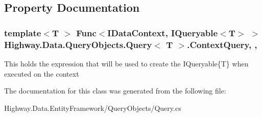 \subsection{Property Documentation}
\hypertarget{class_highway_1_1_data_1_1_query_objects_1_1_query-g_a68ecc8e5735dee1db60782614427cbbf}{
\subsubsection[{Context\-Query}]{\setlength{\rightskip}{0pt plus 5cm}template$<$T $>$ Func$<${\bf I\-Data\-Context}, I\-Queryable$<$T$>$ $>$ {\bf Highway.\-Data.\-Query\-Objects.\-Query}$<$ T $>$.Context\-Query\hspace{0.3cm}{\ttfamily [get]}, {\ttfamily [set]}, {\ttfamily [protected]}}}\label{class_highway_1_1_data_1_1_query_objects_1_1_query-g_a68ecc8e5735dee1db60782614427cbbf}


This holds the expression that will be used to create the I\-Queryable\{\-T\} when executed on the context 



The documentation for this class was generated from the following file\-:\begin{DoxyCompactItemize}
\item 
Highway.\-Data.\-Entity\-Framework/\-Query\-Objects/Query.\-cs\end{DoxyCompactItemize}

